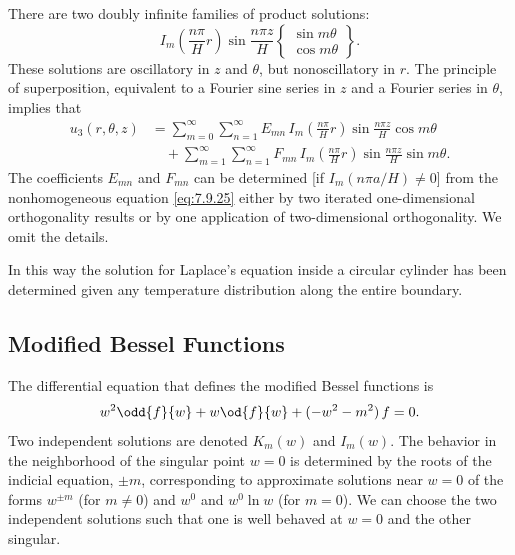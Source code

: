 There are two doubly infinite families of product solutions:
\begin{equation}
I_m\left(\frac{n\pi}{H}r\right)\sin\frac{n\pi z}{H}
\begin{Bmatrix} \sin m\theta \\ \cos m\theta \end{Bmatrix}.
\label{eq:7.9.37}
\end{equation}
These solutions are oscillatory in $z$ and $\theta$, but nonoscillatory in $r$.  The principle of superposition, equivalent to a Fourier sine series in $z$ and a Fourier series in $\theta$, implies that
\begin{equation}
\boxed{\begin{aligned}
u_3(r,\theta,z) &= \sum_{m=0}^{\infty}\sum_{n=1}^{\infty} E_{mn}\,I_m\left(\frac{n\pi}{H}r\right)\sin\frac{n\pi z}{H}\cos m\theta \\
&\quad + \sum_{m=1}^{\infty}\sum_{n=1}^{\infty} F_{mn}\,I_m\left(\frac{n\pi}{H}r\right)\sin\frac{n\pi z}{H}\sin m\theta.
\end{aligned}}
\label{eq:7.9.38}
\end{equation}
The coefficients $E_{mn}$ and $F_{mn}$ can be determined [if $I_m(n\pi a/H) \neq 0$] from the nonhomogeneous equation \eqref{eq:7.9.25} either by two iterated one-dimensional orthogonality results or by one application of two-dimensional orthogonality.  We omit the details.

In this way the solution for Laplace's equation inside a circular cylinder has been determined given any temperature distribution along the entire boundary.

\subsection{Modified Bessel Functions}
\label{sec:7.9.5}

The differential equation that defines the modified Bessel functions is
\begin{equation}
w^2\odd{f}{w} + w\od{f}{w} + (-w^2 - m^2)\,f = 0.
\label{eq:7.9.39}
\end{equation}
Two independent solutions are denoted $K_m(w)$ and $I_m(w)$.  The behavior in the neighborhood of the singular point $w = 0$ is determined by the roots of the indicial equation, $\pm m$, corresponding to approximate solutions near $w = 0$ of the forms $w^{\pm m}$ (for $m \neq 0$) and $w^0$ and $w^0\ln w$ (for $m = 0$).  We can choose the two independent solutions such that one is well behaved at $w = 0$ and the other singular.

